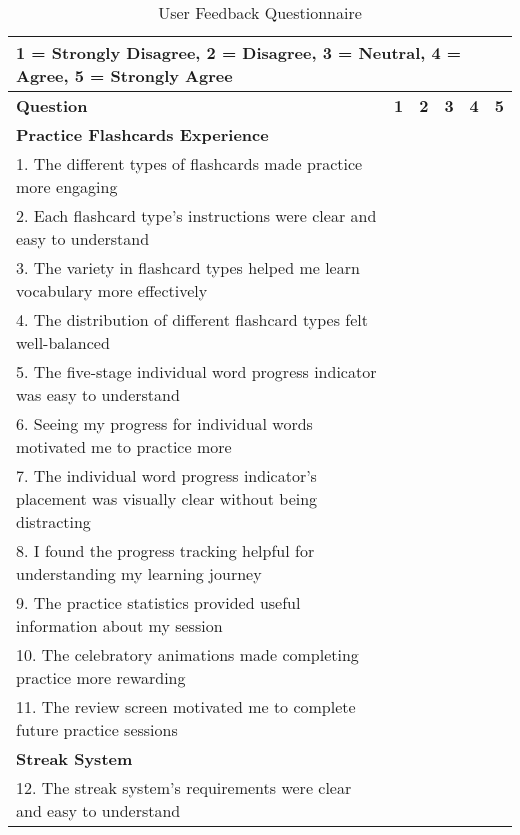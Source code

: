 
\begin{table}[h]
    \centering
    \caption{User Feedback Questionnaire}
    \label{tab:questionnaire}
    \begin{tabular}{|p{}|c|c|c|c|c|}
        \hline
        \multicolumn{6}{|l|}{\small 1 = Strongly Disagree, 2 = Disagree, 3 = Neutral, 4 = Agree, 5 = Strongly Agree} \\
        \hline
        \textbf{Question} & \textbf{1} & \textbf{2} & \textbf{3} & \textbf{4} & \textbf{5} \\
        \hline
        \multicolumn{6}{|l|}{\textbf{Practice Flashcards Experience}} \\
        \hline
        1. The different types of flashcards made practice more engaging & & & & & \\
        \hline
        2. Each flashcard type's instructions were clear and easy to understand & & & & & \\
        \hline
        3. The variety in flashcard types helped me learn vocabulary more effectively & & & & & \\
        \hline
        4. The distribution of different flashcard types felt well-balanced & & & & & \\
        \hline
        5. The five-stage individual word progress indicator was easy to understand & & & & & \\
        \hline
        6. Seeing my progress for individual words motivated me to practice more & & & & & \\
        \hline
        7. The individual word progress indicator's placement was visually clear without being distracting & & & & & \\
        \hline
        8. I found the progress tracking helpful for understanding my learning journey & & & & & \\
        \hline
        9. The practice statistics provided useful information about my session & & & & & \\
        \hline
        10. The celebratory animations made completing practice more rewarding & & & & & \\
        \hline
        11. The review screen motivated me to complete future practice sessions & & & & & \\
        \hline
        \multicolumn{6}{|l|}{\textbf{Streak System}} \\
        \hline
        12. The streak system's requirements were clear and easy to understand & & & & & \\

\end{tabular}
\end{table}
